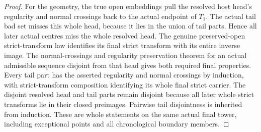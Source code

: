 \begin{proof}
For the geometry, the true open embeddings pull the resolved host
head's regularity and normal crossings back to the actual endpoint of
$T_1$. The actual tail bad set misses this whole head, because it lies
in the union of tail parts. Hence all later actual centres miss the
whole resolved head. The genuine preserved-open strict-transform law
identifies its final strict transform with its entire inverse image.
The normal-crossings and regularity preservation theorem for an actual
admissible sequence disjoint from that head gives both required final
properties. Every tail part has the asserted regularity and normal
crossings by induction, with strict-transform composition identifying
its whole final strict carrier. The disjoint resolved head and tail
parts remain disjoint because all later whole strict transforms lie
in their closed preimages. Pairwise tail disjointness is inherited from
induction. These are whole statements on the same actual final tower,
including exceptional points and all chronological boundary members.
\end{proof}
